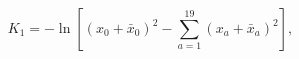 \begin{equation}K_1=-\ln[(x_0+\bar x_0)^2-\sum_{a=1}^{19}(x_a+\bar
x_a)^2],\label{k1}\end{equation} 
